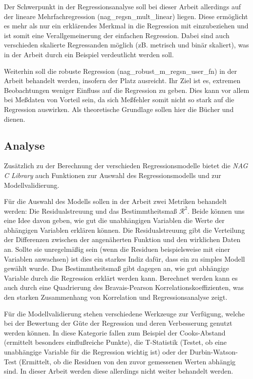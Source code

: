 \documentclass{article}
\begin{document}
Der Schwerpunkt in der Regressionsanalyse soll bei dieser Arbeit allerdings auf der lineare Mehrfachregression (nag\_regsn\_mult\_linear) liegen.
Diese ermöglicht es mehr als nur ein erklärendes Merkmal in die Regression mit einzubeziehen und ist somit eine Verallgemeinerung der einfachen Regression.
Dabei sind auch verschieden skalierte Regressanden möglich (zB. metrisch und binär skaliert), was in der Arbeit durch ein Beispiel verdeutlicht werden soll.

Weiterhin soll die robuste Regression (nag\_robust\_m\_regsn\_user\_fn) in der Arbeit behandelt werden, insofern der Platz ausreicht.
Ihr Ziel ist es, extremen Beobachtungen weniger Einfluss auf die Regression zu geben.
Dies kann vor allem bei Meßdaten von Vorteil sein, da sich Meßfehler somit nicht so stark auf die Regression auswirken.
Als theoretische Grundlage sollen hier die Bücher \cite{Hampel1986} und \cite{Huber1981} dienen.


\subsection{Analyse}

Zusätzlich zu der Berechnung der verschieden Regressionsmodelle bietet die {\it NAG C Library} auch Funktionen zur Auswahl des Regressionsmodells und zur Modellvalidierung.

Für die Auswahl des Modells sollen in der Arbeit zwei Metriken behandelt werden: Die Residualstreuung und das Bestimmtheitsmaß $\mathcal{R}^2$.
Beide können uns eine Idee davon geben, wie gut die unabhängigen Variablen die Werte der abhängigen Variablen erklären können.
Die Residualstreuung gibt die Verteilung der Differenzen zwischen der angenäherten Funktion und den wirklichen Daten an.
Sollte sie unregelmäßig sein (wenn die Residuen beispielsweise mit einer Variablen anwachsen) ist dies ein starkes Indiz dafür, dass ein zu simples Modell gewählt wurde. 
Das Bestimmtheitsmaß gibt dagegen an, wie gut abhängige Variable durch die Regression erklärt werden kann.
Berechnet werden kann es auch durch eine Quadrierung des Bravais-Pearson Korrelationskoeffizienten, was den starken Zusammenhang von Korrelation und Regressionsanalyse zeigt.

Für die Modellvalidierung stehen verschiedene Werkzeuge zur Verfügung, welche bei der Bewertung der Güte der Regression und deren Verbesserung genutzt werden können.
In diese Kategorie fallen zum Beispiel der Cooks-Abstand (ermittelt besonders einflußreiche Punkte), die T-Statistik (Testet, ob eine unabhängige Variable für die Regression wichtig ist) oder der Durbin-Watson-Test (Ermittelt, ob die Residuen von den zuvor gemessenen Werten abhängig sind.
In dieser Arbeit werden diese allerdings nicht weiter behandelt werden.
\end{document}
